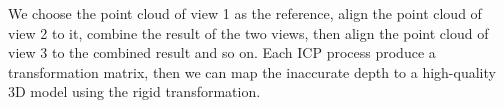 \documentclass{article}
\begin{document}
We choose the point cloud of view 1 as the reference, align the point cloud of view 2 to it, combine the result of the two views, then align the point cloud of view 3 to the combined result and so on. Each ICP process produce a transformation matrix, then we can map the inaccurate depth to a high-quality 3D model using the rigid transformation.






\end{document}
